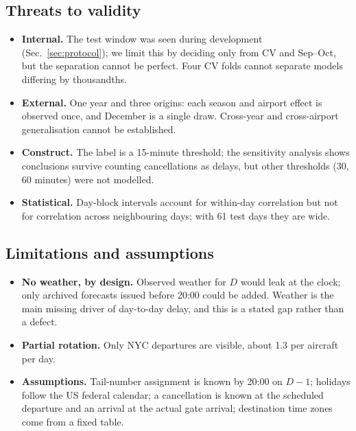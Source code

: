 \documentclass[conference]{IEEEtran}
\begin{document}
\subsection{Threats to validity}
\begin{itemize}
\item \textbf{Internal.} The test window was seen during development (Sec.~\ref{sec:protocol}); we limit this by deciding only from CV and Sep--Oct, but the separation cannot be perfect. Four CV folds cannot separate models differing by thousandths.
\item \textbf{External.} One year and three origins: each season and airport effect is observed once, and December is a single draw. Cross-year and cross-airport generalisation cannot be established.
\item \textbf{Construct.} The label is a 15-minute threshold; the sensitivity analysis shows conclusions survive counting cancellations as delays, but other thresholds (30, 60 minutes) were not modelled.
\item \textbf{Statistical.} Day-block intervals account for within-day correlation but not for correlation across neighbouring days; with 61 test days they are wide.
\end{itemize}

\subsection{Limitations and assumptions}\label{sec:limits}
\begin{itemize}
\item \textbf{No weather, by design.} Observed weather for $D$ would leak at the clock; only archived forecasts issued before 20:00 could be added. Weather is the main missing driver of day-to-day delay, and this is a stated gap rather than a defect.
\item \textbf{Partial rotation.} Only NYC departures are visible, about 1.3 per aircraft per day.
\item \textbf{Assumptions.} Tail-number assignment is known by 20:00 on $D-1$; holidays follow the US federal calendar; a cancellation is known at the scheduled departure and an arrival at the actual gate arrival; destination time zones come from a fixed table.
\end{itemize}
\end{document}
